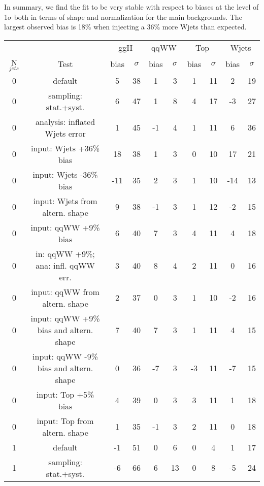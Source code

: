 In summary, we find the fit to be very stable with respect to biases at the level of 1$\sigma$ both in terms of shape and 
normalization for the main backgrounds. The largest observed bias is 18\% when injecting a 36\% more Wjets than expected.

\begin{table}
\begin{center}
\begin{tabular}{c | c  | c c | c c | c c | c c}
\hline
          &      & \multicolumn{2}{c|}{ggH} & \multicolumn{2}{c|}{qqWW} & \multicolumn{2}{c|}{Top} & \multicolumn{2}{c}{Wjets} \\
N$_{jets}$ & Test & bias & $\sigma$ & bias & $\sigma$ & bias & $\sigma$ & bias & $\sigma$ \\
\hline
0 & default                             & 5  & 38 & 1 & 3 & 1 & 11 & 2  & 19 \\
0 & sampling: stat.+syst.               & 6  & 47 & 1 & 8 & 4 & 17 &-3  & 27 \\
\hline
0 & analysis: inflated Wjets error      & 1  & 45 &-1 & 4 & 1 & 11 & 6  & 36 \\
0 & input: Wjets +36\% bias             & 18 & 38 & 1 & 3 & 0 & 10 & 17 & 21 \\
0 & input: Wjets -36\% bias             &-11 & 35 & 2 & 3 & 1 & 10 &-14 & 13 \\
0 & input: Wjets from altern. shape     & 9  & 38 &-1 & 3 & 1 & 12 &-2  & 15 \\
\hline
0 & input: qqWW +9\% bias               & 6  & 40 & 7 & 3 & 4 & 11 & 4  & 18 \\
0 & in: qqWW +9\%; ana: infl. qqWW err. & 3  & 40 & 8 & 4 & 2 & 11 & 0  & 16 \\
0 & input: qqWW from altern. shape      & 2  & 37 & 0 & 3 & 1 & 10 &-2  & 16 \\
0 & input: qqWW +9\% bias and altern. shape & 7  & 40 & 7 & 3 & 1 & 11 & 4  & 15 \\
0 & input: qqWW -9\% bias and altern. shape & 0  & 36 &-7 & 3 &-3 & 11 &-7  & 15 \\
\hline
0 & input: Top +5\% bias                & 4  & 39 & 0 & 3 & 3 & 11 & 1  & 18 \\
0 & input: Top from altern. shape       & 1  & 35 &-1 & 3 & 2 & 11 & 0  & 18 \\
\hline
\hline
1 & default                             &-1  & 51 & 0 & 6  & 0 & 4 & 1  & 17 \\
1 & sampling: stat.+syst.               &-6  & 66 & 6 & 13 & 0 & 8 &-5  & 24 \\

\end{tabular}
\end{center}
\end{table}
